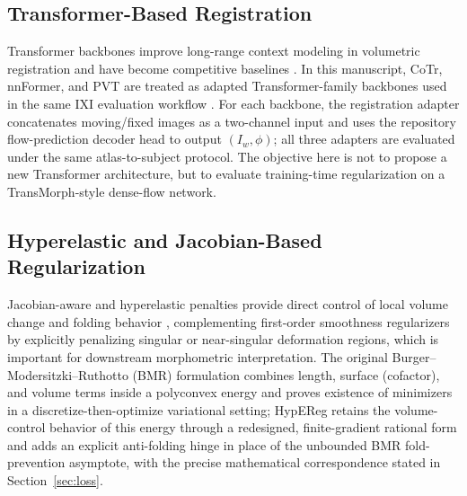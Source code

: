 \documentclass[jimaging,article,submit,pdftex,moreauthors]{Definitions/mdpi}
\begin{document}
\subsection{Transformer-Based Registration}
Transformer backbones improve long-range context modeling in volumetric registration and have become competitive baselines \cite{chen2022transmorph,liu2021swin}. In this manuscript, CoTr, nnFormer, and PVT are treated as adapted Transformer-family backbones used in the same IXI evaluation workflow \cite{xie2021cotr,zhou2023nnformer,wang2021pvt}. For each backbone, the registration adapter concatenates moving/fixed images as a two-channel input and uses the repository flow-prediction decoder head to output \((I_w,\phi)\); all three adapters are evaluated under the same atlas-to-subject protocol. The objective here is not to propose a new Transformer architecture, but to evaluate training-time regularization on a TransMorph-style dense-flow network.

\subsection{Hyperelastic and Jacobian-Based Regularization}
Jacobian-aware and hyperelastic penalties provide direct control of local volume change and folding behavior \cite{burger2013hyperelastic}, complementing first-order smoothness regularizers by explicitly penalizing singular or near-singular deformation regions, which is important for downstream morphometric interpretation. The original Burger--Modersitzki--Ruthotto (BMR) formulation combines length, surface (cofactor), and volume terms inside a polyconvex energy and proves existence of minimizers in a discretize-then-optimize variational setting; HypEReg retains the volume-control behavior of this energy through a redesigned, finite-gradient rational form and adds an explicit anti-folding hinge in place of the unbounded BMR fold-prevention asymptote, with the precise mathematical correspondence stated in Section~\ref{sec:loss}.
\end{document}
